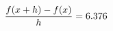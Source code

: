 \documentclass[preview]{standalone}
\begin{document}
\begin{align*}
\special{dvisvgm:raw <g id='unique000'>}\frac{f(x+h)-f(x)}{h} = 6.376\special{dvisvgm:raw </g>}
\end{align*}
\end{document}
